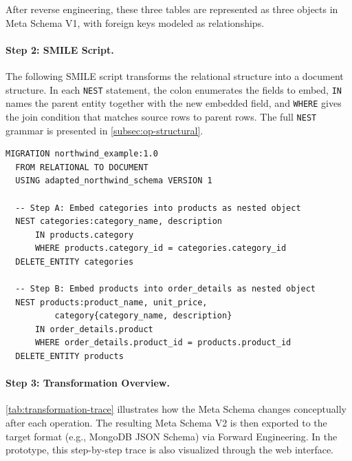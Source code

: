   After reverse engineering, these three tables are represented as three  objects in Meta Schema V1, with foreign keys modeled as
   relationships.

  \paragraph{Step 2: SMILE  Script.}
  The following SMILE script transforms the relational structure into a document structure. In each
  \texttt{NEST} statement, the colon enumerates the fields to embed, \texttt{IN} names the parent
  entity together with the new embedded field, and \texttt{WHERE} gives the join condition that
  matches source rows to parent rows. The full \texttt{NEST} grammar is presented in
  \autoref{subsec:op-structural}.


\begin{lstlisting}[basicstyle=\small\ttfamily]
  MIGRATION northwind_example:1.0
  FROM RELATIONAL TO DOCUMENT
  USING adapted_northwind_schema VERSION 1

  -- Step A: Embed categories into products as nested object
  NEST categories:category_name, description
      IN products.category
      WHERE products.category_id = categories.category_id
  DELETE_ENTITY categories

  -- Step B: Embed products into order_details as nested object
  NEST products:product_name, unit_price,
          category{category_name, description}
      IN order_details.product
      WHERE order_details.product_id = products.product_id
  DELETE_ENTITY products
  \end{lstlisting}

  \paragraph{Step 3: Transformation Overview.}
  \autoref{tab:transformation-trace} illustrates how the Meta Schema changes conceptually after each operation. The resulting Meta Schema V2 is then
   exported to the target format (e.g., MongoDB JSON Schema) via Forward Engineering. In the prototype, this step-by-step trace is also visualized
  through the web interface.

